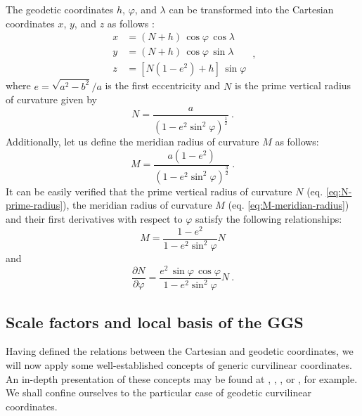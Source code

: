 \documentclass[mreferee]{gji}
\begin{document}
The geodetic coordinates $h$, $\varphi$, and $\lambda$ can be transformed
into the Cartesian coordinates $x$, $y$, and $z$ as follows
\citep{heiskanen-moritz1967}:
\begin{equation} \label{eq:geodetic-2-cartesian}
\begin{split}
x &= \left( N + h \right) \, \cos\varphi \, \cos\lambda \\ 
y &= \left( N + h \right) \, \cos\varphi \, \sin\lambda \\
z &= \left[ N \left( 1 - e^{2} \right) + h \right] \, \sin\varphi
\end{split} \: ,
\end{equation}
where $e = \sqrt{a^{2} - b^{2}}/a$ is the first eccentricity and
$N$ is the prime vertical radius of curvature given by
\begin{equation} \label{eq:N-prime-radius}
N = \frac{a}{\left( 1 - e^{2} \sin^{2}\varphi \right)^{\frac{1}{2}}} \: .
\end{equation}
Additionally, let us define the meridian radius of curvature $M$ as
follows:
\begin{equation} \label{eq:M-meridian-radius}
M = \frac{a \left( 1 - e^{2} \right)}{\left( 1 - e^{2} \sin^{2}\varphi \right)^{\frac{3}{2}}} \: .
\end{equation}
It can be easily verified that the prime vertical radius of curvature $N$
(eq. \ref{eq:N-prime-radius}), the meridian radius of curvature $M$
(eq. \ref{eq:M-meridian-radius}) and their first derivatives with respect to
$\varphi$ satisfy the following relationships:
\begin{equation} \label{eq:relation-betwen-N-M}
M = \frac{1 - e^{2}}{1 - e^{2} \sin^{2}\varphi} N
\end{equation}
and
\begin{equation} \label{eq:N-derivative}
\frac{\partial N}{\partial \varphi} = \frac{e^{2} \, \sin \varphi \, \cos \varphi}{1 - e^{2} \sin^{2}\varphi} N \: .
\end{equation}


\subsection{Scale factors and local basis of the GGS}


Having defined the relations between the Cartesian and geodetic coordinates,
we will now apply some well-established concepts of generic curvilinear
coordinates. An in-depth presentation of these concepts may be found at
\citet{kellogg1929}, \citet{hotine1969}, \citet{arfken2001}, or \citet{sttraton2007},
for example. We shall confine ourselves to
the particular case of geodetic curvilinear coordinates.
\end{document}
